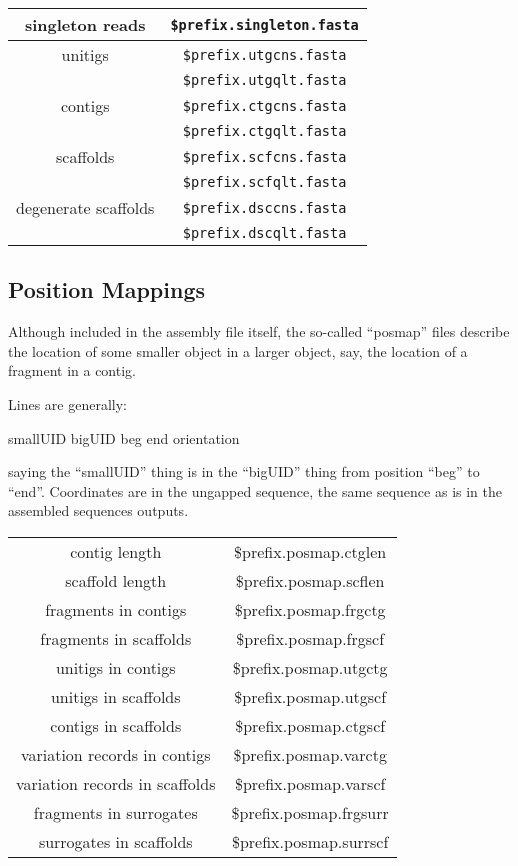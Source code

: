 \documentclass[twoside,11pt]{article}
\begin{document}
\begin{center}
\begin{tabular}{|c|c|}
\hline
\hline
singleton reads      & {\tt \$prefix.singleton.fasta} \\
\hline
unitigs              & {\tt \$prefix.utgcns.fasta} \\
                     & {\tt \$prefix.utgqlt.fasta} \\
\hline
contigs              & {\tt \$prefix.ctgcns.fasta} \\
                     & {\tt \$prefix.ctgqlt.fasta} \\
\hline
scaffolds            & {\tt \$prefix.scfcns.fasta} \\
                     & {\tt \$prefix.scfqlt.fasta} \\
\hline
degenerate scaffolds & {\tt \$prefix.dsccns.fasta} \\
                     & {\tt \$prefix.dscqlt.fasta} \\
\hline
\end{tabular}
\end{center}

\subsection{Position Mappings}

Although included in the assembly file itself, the so-called
``posmap'' files describe the location of some smaller object in a
larger object, say, the location of a fragment in a contig.

Lines are generally:

smallUID bigUID beg end orientation

saying the ``smallUID'' thing is in the ``bigUID'' thing from position
``beg'' to ``end''.  Coordinates are in the ungapped sequence, the
same sequence as is in the assembled sequences outputs.

\begin{center}
\begin{tabular}{|c|c|}
\hline
\hline
contig length   & \$prefix.posmap.ctglen \\
scaffold length & \$prefix.posmap.scflen \\
\hline
fragments in contigs   & \$prefix.posmap.frgctg \\
fragments in scaffolds & \$prefix.posmap.frgscf \\
\hline
unitigs in contigs     & \$prefix.posmap.utgctg \\
unitigs in scaffolds   & \$prefix.posmap.utgscf \\
\hline
contigs in scaffolds   & \$prefix.posmap.ctgscf \\
\hline
variation records in contigs   & \$prefix.posmap.varctg \\
variation records in scaffolds & \$prefix.posmap.varscf \\
\hline
fragments in surrogates  & \$prefix.posmap.frgsurr \\
surrogates in scaffolds  & \$prefix.posmap.surrscf \\
\hline
\end{tabular}
\end{center}
\end{document}
